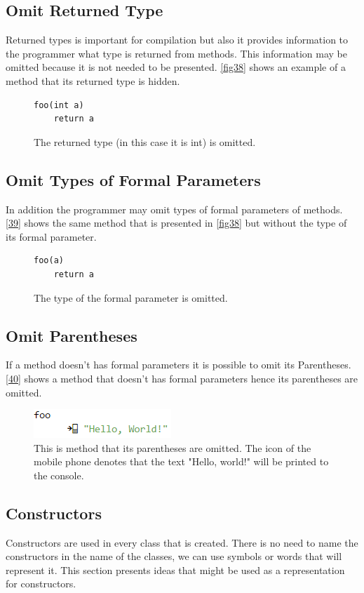 \subsection{Omit Returned Type}
Returned types is important for compilation but also it provides information to the programmer what type is returned from methods. This information may be omitted because it is not needed to be presented. \autoref{fig38} shows an example of a method that its returned type is hidden.
\begin{figure}[H]
\begin{lstlisting}
foo(int a)
	return a
\end{lstlisting}
\caption{The returned type (in this case it is int) is omitted.}
\label{fig38}
\end{figure}
\subsection{Omit Types of Formal Parameters}
In addition the programmer may omit types of formal parameters of methods. \autoref{39} shows the same method that is presented in \autoref{fig38} but without the type of its formal parameter.
\begin{figure}[H]
\begin{lstlisting}
foo(a)
	return a
\end{lstlisting}
\caption{The type of the formal parameter is omitted.}
\label{fig39}
\end{figure}
\subsection{Omit Parentheses}
If a method doesn't has formal parameters it is possible to omit its Parentheses. \autoref{40} shows a method that doesn't has formal parameters hence its parentheses are omitted.
\begin{figure}[H]
\includegraphics{"./fig/foo with omitted parentheses"}
\caption{This is method that its parentheses are omitted. The icon of the mobile phone denotes that the text "Hello, world!" will be printed to the console.}
\label{fig40}
\end{figure}
\subsection{Constructors}
Constructors are used in every class that is created. There is no need to name the constructors in the name of the classes, we can use symbols or words that will represent it. This section presents ideas that might be used as a representation for constructors.

